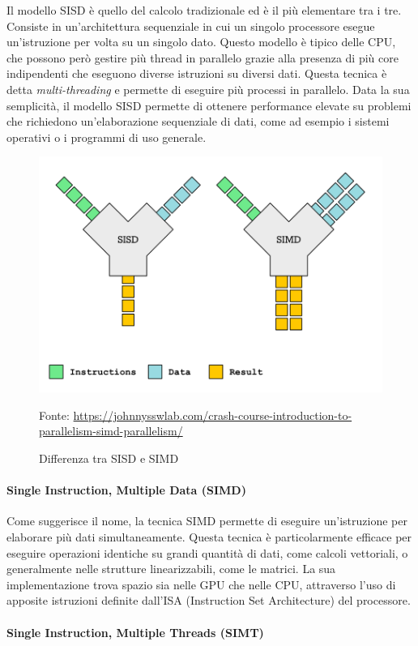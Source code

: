 Il modello SISD è quello del calcolo tradizionale ed è il più elementare tra i tre.
Consiste in un'architettura sequenziale in cui un singolo processore esegue un'istruzione
per volta su un singolo dato. Questo modello è tipico delle CPU, che possono
però gestire più thread in parallelo grazie alla presenza di più core
indipendenti che eseguono diverse istruzioni su diversi dati. Questa tecnica è detta
\textit{multi-threading} e permette di eseguire più processi in parallelo. Data la
sua semplicità, il modello SISD permette di ottenere performance elevate su
problemi che richiedono un'elaborazione sequenziale di dati, come ad esempio i sistemi
operativi o i programmi di uso generale.

\begin{figure}[h!]
  \centering
  \includegraphics[width=.40\linewidth]{images/examples/sisd-simd.png}
  \caption{Differenza tra SISD e SIMD}
  \label{fig:sisd-simt} \footnotesize{Fonte: \url{https://johnnysswlab.com/crash-course-introduction-to-parallelism-simd-parallelism/}}
\end{figure}

\paragraph{Single Instruction, Multiple Data (SIMD)}
\label{para:simd}

Come suggerisce il nome, la tecnica SIMD permette di eseguire un'istruzione per elaborare
più dati simultaneamente. Questa tecnica è particolarmente efficace per eseguire
operazioni identiche su grandi quantità di dati, come calcoli vettoriali, o
generalmente nelle strutture linearizzabili, come le matrici. La sua
implementazione trova spazio sia nelle GPU che nelle CPU, attraverso l'uso di apposite
istruzioni definite dall'ISA (Instruction Set Architecture) del processore.

\paragraph{Single Instruction, Multiple Threads (SIMT)\cite{generalpurposegpu}}
\label{para:simt}

